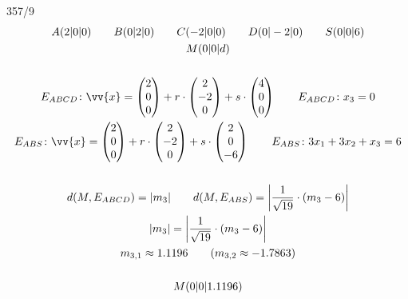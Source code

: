 \begin{exercise}{357/9}
  \begin{gather*}
    A(2|0|0) \qquad B(0|2|0) \qquad C(-2|0|0) \qquad D(0|-2|0) \qquad S(0|0|6) \\
    M(0|0|d) \\\\
    E_{ABCD} \colon \vv{x} = \begin{pmatrix}2 \\ 0 \\ 0\end{pmatrix} + r \cdot \begin{pmatrix}2 \\ -2 \\ 0\end{pmatrix} + s \cdot \begin{pmatrix}4 \\ 0 \\ 0\end{pmatrix} \qquad E_{ABCD} \colon x_3 = 0 \\
    E_{ABS} \colon \vv{x} = \begin{pmatrix}2 \\ 0 \\ 0\end{pmatrix} + r \cdot \begin{pmatrix}2 \\ -2 \\ 0\end{pmatrix} + s \cdot \begin{pmatrix}2 \\ 0 \\ -6\end{pmatrix} \qquad E_{ABS} \colon 3x_1 + 3x_2 + x_3 = 6 \\\\
    d(M, E_{ABCD}) = |m_3| \qquad d(M, E_{ABS}) = \left|\frac{1}{\sqrt{19}} \cdot (m_3 - 6)\right| \\
    |m_3| = \left|\frac{1}{\sqrt{19}} \cdot (m_3 - 6)\right| \\
    m_{3,1} \approx 1.1196 \qquad (m_{3,2} \approx -1.7863) \\\\
    M(0|0|1.1196)
  \end{gather*}
\end{exercise}
